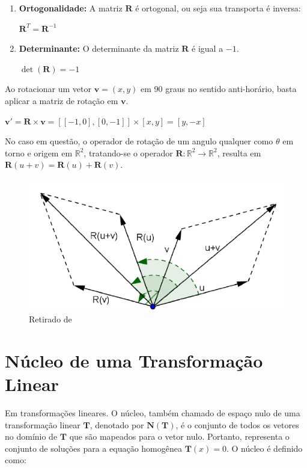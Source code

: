 \begin{enumerate}
	\item \textbf{Ortogonalidade:} A matriz $\mathbf{R}$ é ortogonal, ou seja sua transporta é inversa:
	
	\centerline{$\mathbf{R}^T = \mathbf{R}^{-1}$}
	\item \textbf{Determinante:} O determinante da matriz $\mathbf{R}$ é igual a $-1$.
	
	\centerline{$\det(\mathbf{R}) = -1$}
\end{enumerate}

Ao rotacionar um vetor $\mathbf{v} = (x, y)$ em 90 graus  no sentido anti-horário, basta aplicar a matriz de rotação em $\mathbf{v}$.

\centerline{$\mathbf{v}' = \mathbf{R} \times \mathbf{v} = [[-1, 0], [0, -1]] \times [x, y] = [y, -x]$}

No caso em questão, o operador de rotação de um angulo qualquer como $\theta$ em torno e origem em $\mathbb{R}^2$, tratando-se o operador $\mathbf{R}: \mathbb{R}^2 \longrightarrow \mathbb{R}^2$, resulta em $\mathbf{R}(u + v) = \mathbf{R}(u) + \mathbf{R}(v)$.

\begin{figure}[H]
	\centering
	\includegraphics[scale=0.90]{t_rotacao.png}
	\caption{Retirado de \cite{nogueira2013}}
\end{figure}

\section{Núcleo de uma Transformação Linear}
Em transformações lineares. O núcleo, também chamado de espaço nulo de uma transformação linear $\mathbf{T}$, denotado por  $\mathbf{N}(\mathbf{T})$, é o conjunto de todos os vetores no domínio de $\mathbf{T}$ que são mapeados para o vetor nulo. Portanto, representa o conjunto de soluções para a equação homogênea $\mathbf{T}(x) = 0$. O núcleo é definido como:

